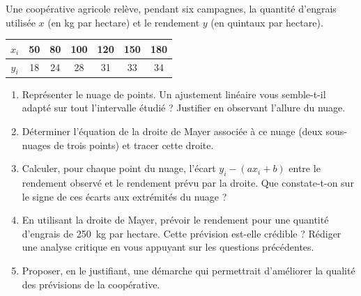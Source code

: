 \documentclass[11pt]{article}
\begin{document}
\begin{exercice}
Une coopérative agricole relève, pendant six campagnes, la quantité d'engrais utilisée $x$ (en \si{\kilo\gram} par hectare) et le rendement $y$ (en quintaux par hectare).

\begin{center}
\begin{tabular}{|c|c|c|c|c|c|c|}
\hline
$x_i$ & 50 & 80 & 100 & 120 & 150 & 180 \\
\hline
$y_i$ & 18 & 24 & 28 & 31 & 33 & 34 \\
\hline
\end{tabular}
\end{center}

\begin{enumerate}
\item Représenter le nuage de points. Un ajustement linéaire vous semble-t-il adapté sur tout l'intervalle étudié ? Justifier en observant l'allure du nuage.
\item Déterminer l'équation de la droite de Mayer associée à ce nuage (deux sous-nuages de trois points) et tracer cette droite.
\item Calculer, pour chaque point du nuage, l'écart $y_i - (ax_i + b)$ entre le rendement observé et le rendement prévu par la droite. Que constate-t-on sur le signe de ces écarts aux extrémités du nuage ?
\item En utilisant la droite de Mayer, prévoir le rendement pour une quantité d'engrais de \SI{250}{\kilo\gram} par hectare. Cette prévision est-elle crédible ? Rédiger une analyse critique en vous appuyant sur les questions précédentes.
\item Proposer, en le justifiant, une démarche qui permettrait d'améliorer la qualité des prévisions de la coopérative.
\end{enumerate}
\end{exercice}
\end{document}
